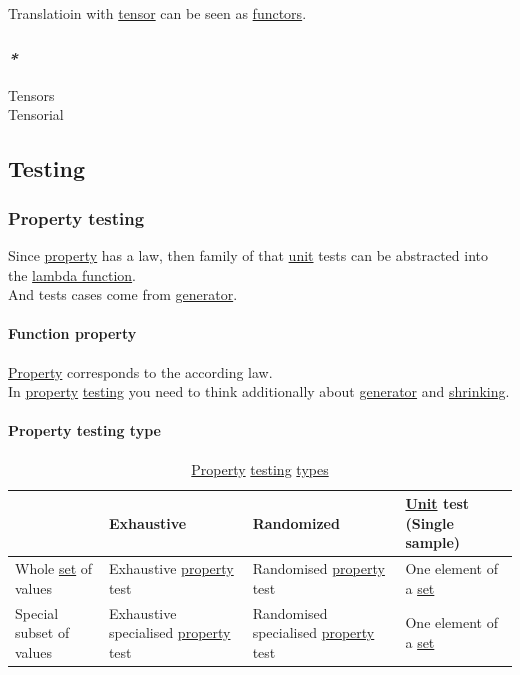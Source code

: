 \documentclass[11pt]{article}
\begin{document}
Translatioin with \hyperref[orgae4c474]{tensor} can be seen as \hyperref[org6c3c2a6]{functors}.\\

\subsubsection{\emph{*}}
\label{sec:orgb9009fc}

\label{org1fdd1da}Tensors\\
\label{orga0bca4d}Tensorial\\

\subsection{\label{orgba42eb2}Testing}
\label{sec:org2b41ddc}
\subsubsection{\label{org55bbfc0}Property testing}
\label{sec:orgd1a2f5d}
Since \hyperref[org07ca26b]{property} has a law, then family of that \hyperref[org2833f3f]{unit} tests can be abstracted into the \hyperref[org496f5c2]{lambda function}.\\
And tests cases come from \hyperref[org7808460]{generator}.\\

\paragraph{\label{org341dec8}Function property}
\label{sec:org3198a4f}
\hyperref[org07ca26b]{Property} corresponds to the according law.\\
In \hyperref[org07ca26b]{property} \hyperref[orgba42eb2]{testing} you need to think additionally about \hyperref[org7808460]{generator} and \hyperref[org6a14777]{shrinking}.\\

\paragraph{\label{org526cd0c}Property testing type}
\label{sec:org858d100}

\begin{table}[htbp]
\caption{\label{tab:property-testing-type}\hyperref[org07ca26b]{Property} \hyperref[orgba42eb2]{testing} \hyperref[org3927fd9]{types}}
\centering
\begin{tabular}{llll}
\hline
 & Exhaustive & Randomized & \hyperref[org2833f3f]{Unit} test (Single sample)\\
\hline
Whole \hyperref[orgbed80ba]{set} of values & Exhaustive \hyperref[org07ca26b]{property} test & Randomised \hyperref[org07ca26b]{property} test & One element of a \hyperref[orgbed80ba]{set}\\
Special subset of values & Exhaustive specialised \hyperref[org07ca26b]{property} test & Randomised specialised \hyperref[org07ca26b]{property} test & One element of a \hyperref[orgbed80ba]{set}\\
\hline
\end{tabular}
\end{table}
\end{document}
